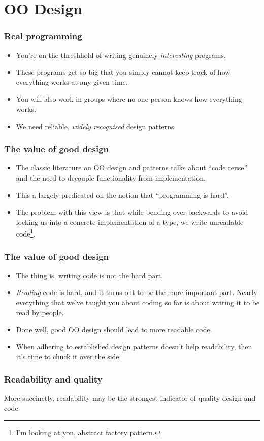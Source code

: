 \documentclass[10pt]{beamer}
\begin{document}
\section{OO Design}
\begin{frame}
	\frametitle{Real programming}
	\begin{itemize}
		\item You're on the threshhold of writing genuinely 
			\emph{interesting} programs.
		\item These programs get so big that you simply
			cannot keep track of how everything works
			at any given time.
		\item You will also work in groups where no one person
			knows how everything works.
		\item We need reliable, \emph{widely recognised} design
			patterns 
	\end{itemize}
\end{frame}

\begin{frame}
	\frametitle{The value of good design}
	\begin{itemize}
		\item The classic literature on OO design and 
			patterns talks about ``code reuse'' and 
			the need to decouple functionality from 
			implementation.
		\item This a largely predicated on the notion that 
			``programming is hard''.
		\item The problem with this view is that while bending 
			over backwards to avoid locking us into a 
			concrete implementation of a type, we write 
			unreadable code\footnote{I'm looking at you,
			abstract factory pattern.}.
	\end{itemize}
\end{frame}
\begin{frame}
	\frametitle{The value of good design}
	\begin{itemize}
		\item The thing is, writing code is not the hard part.
		\item \emph{Reading} code is hard, and it turns out
			to be the more important part. Nearly everything
			that we've taught you about coding so far is about
			writing it to be read by people.
		\item Done well, good OO design should lead to more readable
			code.
		\item When adhering to established design patterns doesn't 
			help readability, then it's time to chuck it over the 
			side.
	\end{itemize}
\end{frame}
\begin{frame}
	\frametitle{Readability and quality}

         More succinctly, readability may be the strongest indicator of
	 quality design and code.
 \end{frame}
\end{document}
